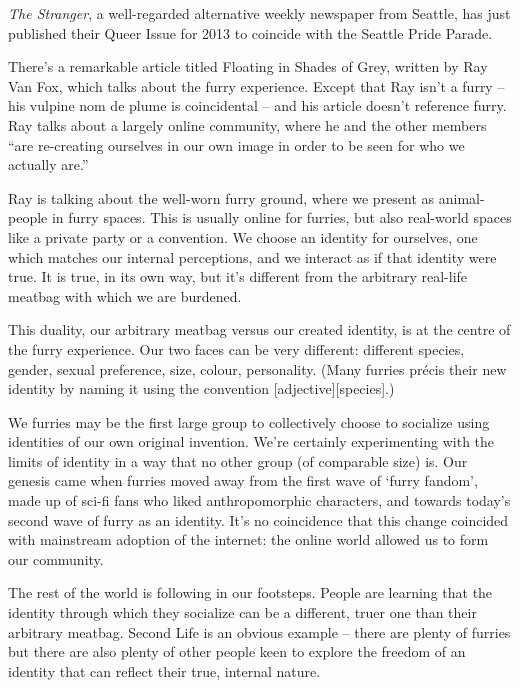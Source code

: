
\textit{The Stranger}, a well-regarded alternative weekly newspaper from Seattle, has just published their Queer Issue for 2013 to coincide with the Seattle Pride Parade.

There's a remarkable article titled Floating in Shades of Grey, written by Ray Van Fox, which talks about the furry experience. Except that Ray isn't a furry -- his vulpine nom de plume is coincidental -- and his article doesn't reference furry. Ray talks about a largely online community, where he and the other members ``are re-creating ourselves in our own image in order to be seen for who we actually are.''

Ray is talking about the well-worn furry ground, where we present as animal-people in furry spaces. This is usually online for furries, but also real-world spaces like a private party or a convention. We choose an identity for ourselves, one which matches our internal perceptions, and we interact as if that identity were true. It is true, in its own way, but it's different from the arbitrary real-life meatbag with which we are burdened.

This duality, our arbitrary meatbag versus our created identity, is at the centre of the furry experience. Our two faces can be very different: different species, gender, sexual preference, size, colour, personality. (Many furries précis their new identity by naming it using the convention [adjective][species].)

We furries may be the first large group to collectively choose to socialize using identities of our own original invention. We're certainly experimenting with the limits of identity in a way that no other group (of comparable size) is. Our genesis came when furries moved away from the first wave of `furry fandom', made up of sci-fi fans who liked anthropomorphic characters, and towards today's second wave of furry as an identity. It's no coincidence that this change coincided with mainstream adoption of the internet: the online world allowed us to form our community.

The rest of the world is following in our footsteps. People are learning that the identity through which they socialize can be a different, truer one than their arbitrary meatbag. Second Life is an obvious example -- there are plenty of furries but there are also plenty of other people keen to explore the freedom of an identity that can reflect their true, internal nature.

